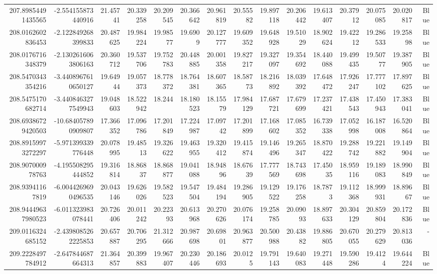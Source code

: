 \begin{center}
\begin{longtable}{rrrrrrrrrrrrrrr}
207.89854491435565 & -2.554155873440916 & 21.45741 & 20.339258 & 20.209545 & 20.366642 & 20.961819 & 20.55582 & 19.897118 & 20.206442 & 19.613407 & 20.37912 & 20.075085 & 20.020817 & Blue \\
208.0162602836453 & -2.122849268399833 & 20.487625 & 19.984224 & 19.98577 & 19.6909 & 20.127777 & 19.609352 & 19.648928 & 19.51029 & 18.902624 & 19.42212 & 19.286533 & 19.25898 & Blue \\
208.0176716348379 & -2.1302616063806163 & 20.360712 & 19.537706 & 19.752783 & 20.448885 & 20.001358 & 19.827217 & 19.327097 & 19.354692 & 18.440088 & 19.499435 & 19.50777 & 19.387905 & Blue \\
208.5470343354216 & -3.4408967610650127 & 19.64944 & 19.057373 & 18.778372 & 18.764381 & 18.607365 & 18.58773 & 18.216892 & 18.039392 & 17.648472 & 17.926247 & 17.777102 & 17.897625 & Blue \\
208.5475170682714 & -3.4408463277549943 & 19.048603 & 18.522942 & 18.244 & 18.180523 & 18.15579 & 17.984129 & 17.687721 & 17.679699 & 17.237421 & 17.438543 & 17.450943 & 17.383041 & Blue \\
208.69386729420503 & -10.684057890909807 & 17.366352 & 17.096786 & 17.201849 & 17.224987 & 17.09742 & 17.201899 & 17.168602 & 17.085352 & 16.739338 & 17.052998 & 16.187008 & 16.520864 & Blue \\
208.89159973272297 & -5.971399339776448 & 20.078995 & 19.48513 & 19.326622 & 19.463955 & 19.320412 & 19.415874 & 19.146496 & 19.265347 & 18.870422 & 19.288742 & 19.221882 & 19.149904 & Blue \\
208.907000978763 & -4.195508295444852 & 19.316814 & 18.86837 & 18.868877 & 19.041088 & 18.94896 & 18.67639 & 17.777569 & 18.743698 & 17.45035 & 18.959116 & 19.189083 & 18.990849 & Blue \\
208.93941167819 & -6.0044269690496535 & 20.043146 & 19.626026 & 19.582523 & 19.547504 & 19.484194 & 19.286905 & 19.129522 & 19.176258 & 18.7873 & 19.112368 & 18.999931 & 18.89667 & Blue \\
208.94449637980523 & -6.011323983078441 & 20.726406 & 20.011242 & 20.22393 & 20.613968 & 20.270626 & 20.076174 & 19.258785 & 20.09093 & 18.897633 & 20.304129 & 20.859804 & 20.172836 & Blue \\
209.0116324685152 & -2.4398085262225853 & 20.657887 & 20.706295 & 21.312666 & 20.987698 & 20.69801 & 20.963877 & 20.500988 & 20.43882 & 19.886805 & 20.670055 & 20.279629 & 20.813036 & - \\
209.2228497784912 & -2.647844687664313 & 21.364857 & 20.399883 & 19.967407 & 20.230446 & 20.186693 & 20.0125 & 19.791143 & 19.640083 & 19.271448 & 19.590286 & 19.4124 & 19.644224 & Blue \\

\end{longtable}
\end{center}
